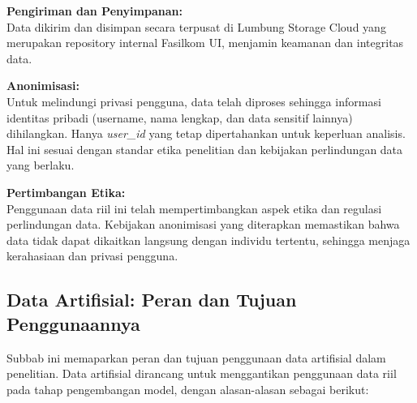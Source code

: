 \textbf{Pengiriman dan Penyimpanan:} \\
Data dikirim dan disimpan secara terpusat di Lumbung Storage Cloud yang merupakan repository internal Fasilkom UI, menjamin keamanan dan integritas data.

\textbf{Anonimisasi:} \\
Untuk melindungi privasi pengguna, data telah diproses sehingga informasi identitas pribadi (username, nama lengkap, dan data sensitif lainnya) dihilangkan. Hanya \textit{user\_id} yang tetap dipertahankan untuk keperluan analisis. Hal ini sesuai dengan standar etika penelitian dan kebijakan perlindungan data yang berlaku.

\textbf{Pertimbangan Etika:} \\
Penggunaan data riil ini telah mempertimbangkan aspek etika dan regulasi perlindungan data. Kebijakan anonimisasi yang diterapkan memastikan bahwa data tidak dapat dikaitkan langsung dengan individu tertentu, sehingga menjaga kerahasiaan dan privasi pengguna.

\subsection{Data Artifisial: Peran dan Tujuan Penggunaannya}
\label{sec:dataArtifisial}
Subbab ini memaparkan peran dan tujuan penggunaan data artifisial dalam penelitian. Data artifisial dirancang untuk menggantikan penggunaan data riil pada tahap pengembangan model, dengan alasan-alasan sebagai berikut:

